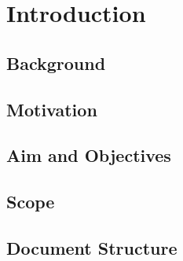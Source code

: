 \section{Introduction}
\label{sec:introduction}

\subsection{Background}
\label{subsec:background}

\subsection{Motivation}
\label{subsec:motivation}

\subsection{Aim and Objectives}
\label{subsec:aims}

\subsection{Scope}
\label{subsec:scope}

\subsection{Document Structure}
\label{subsec:structure}
